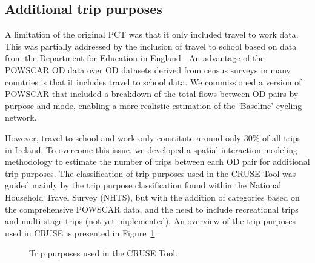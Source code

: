 \documentclass[
  super,
  preprint,
  3p]{elsarticle}
\providecommand{\DIFaddend}{} %
\DeclareRobustCommand{\DIFaddend}{\DIFOaddend \let\includegraphics\DIFOincludegraphics} %
\begin{document}
\DIFaddend \subsection{Additional trip purposes}\label{sec-trip-purposes}

A limitation of the original PCT was that it only included travel to
work data. This was partially addressed by the inclusion of travel to
school based on data from the Department for Education in England
\citep{goodman2019}. An advantage of the POWSCAR OD data over OD
datasets derived from census surveys in many countries is that it
includes travel to school data. We commissioned a version of POWSCAR
that included a breakdown of the total flows between OD pairs by purpose
and mode, enabling a more realistic estimation of the `Baseline' cycling
network.

However, travel to school and work only constitute around only 30\% of
all trips in Ireland. To overcome this issue, we developed a spatial
interaction modeling methodology to estimate the number of trips between
each OD pair for additional trip purposes. The classification of trip
purposes used in the CRUSE Tool was guided mainly by the trip purpose
classification found within the National Household Travel Survey (NHTS),
but with the addition of categories based on the comprehensive POWSCAR
data, and the need to include recreational trips and multi-stage trips
(not yet implemented). An overview of the trip purposes used in CRUSE is
presented in Figure~\ref{fig-trip-purposes}.

\begin{figure}


\caption{\label{fig-trip-purposes}Trip purposes used in the CRUSE Tool.}

\end{figure}%
\end{document}
